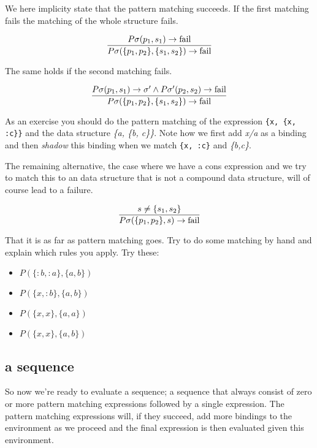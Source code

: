 \documentclass[a4paper,11pt]{article}
\begin{document}
We here implicity state that the pattern matching succeeds. If the first matching fails the matching of the whole structure fails.

$$\frac{P\sigma(p_1, s_1) \rightarrow {\rm fail} }{P\sigma(\lbrace p_1, p_2 \rbrace  , \lbrace s_1, s_2 \rbrace) \rightarrow {\rm fail}}$$

The same holds if the second matching fails.

$$\frac{P\sigma(p_1, s_1) \rightarrow \sigma' \wedge P\sigma'(p_2, s_2) \rightarrow {\rm fail}}{P\sigma(\lbrace p_1, p_2 \rbrace  , \lbrace s_1, s_2 \rbrace) \rightarrow {\rm fail}}$$


As an exercise you should do the pattern matching of the expression
{\tt \{x, \{x, :c\}\}} and the data structure {\em \{a, \{b, c\}\}}. Note
how we first add {\em x/a} as a binding and then {\em shadow} this binding when
we match {\tt \{x, :c\}} and {\em \{b,c\}}.

The remaining alternative, the case where we have a cons expression and
we try to match this to an data structure that is not a compound data
structure, will of course lead to a failure.

$$\frac{s \not = \{s_1, s_2\}}{P\sigma(\lbrace p_1, p_2 \rbrace, s) \rightarrow {\rm fail}}$$

That it is as far as pattern matching goes. Try to do some matching by
hand and explain which rules you apply. Try these:

\begin{itemize}
  
\item $P{}(\lbrace :b, :a \rbrace, \lbrace a, b \rbrace)$  
\item $P{}(\lbrace x, :b \rbrace, \lbrace a, b \rbrace)$
\item $P{}(\lbrace x, x \rbrace, \lbrace a, a \rbrace)$
\item $P{}(\lbrace x, x \rbrace, \lbrace a, b \rbrace)$
\end{itemize}


\subsection{a sequence}

So now we're ready to evaluate a sequence; a sequence that always
consist of zero or more pattern matching expressions followed by a
single expression. The pattern matching expressions will, if they
succeed, add more bindings to the environment as we proceed and the
final expression is then evaluated given this environment.
\end{document}
